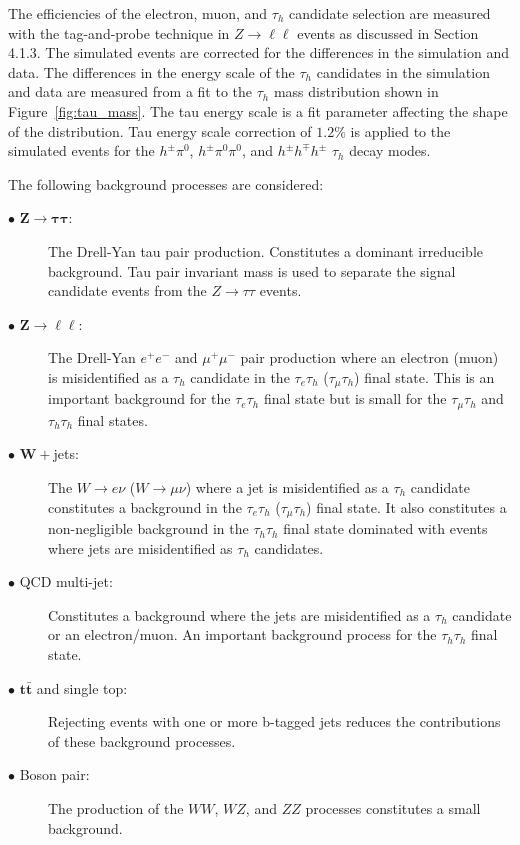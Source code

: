 The efficiencies of the electron, muon, and $\tau_h$ candidate selection are measured with the tag-and-probe technique in $Z\rightarrow \ell\ell$ events as discussed in Section 4.1.3. The simulated events are corrected for the differences in the simulation and data. The differences in the energy scale of the $\tau_h$ candidates in the simulation and data are measured from a fit to the $\tau_h$ mass distribution shown in Figure~\ref{fig:tau_mass}. The tau energy scale is a fit parameter affecting the shape of the distribution. Tau energy scale correction of $1.2\%$ is applied to the simulated events for the $h^{\pm}\pi^{0}$,  $h^{\pm}\pi^{0}\pi^{0}$, and $h^{\pm}h^{\mp}h^{\pm}$ $\tau_{h}$ decay modes. 

The following background processes are considered:
\begin{description}
\item[$\bullet$ $\boldsymbol{Z\rightarrow\tau\tau}$:] The Drell-Yan tau pair production. Constitutes a dominant irreducible background. Tau pair invariant mass is used to separate the signal candidate events from the  $Z\rightarrow\tau\tau$ events.
\item[$\bullet$ $\boldsymbol{Z\rightarrow\ell\ell}$:] The Drell-Yan $e^+e^-$ and $\mu^+\mu^-$ pair production where an electron (muon) is misidentified as a $\tau_h$ candidate in the $\tau_{e}\tau_h$ ($\tau_{\mu}\tau_h$) final state. This is an important background for the $\tau_{e}\tau_h$ final state but is small for the $\tau_{\mu}\tau_h$ and $\tau_{h}\tau_h$ final states.  
\item[$\bullet$ $\boldsymbol{W+}$jets:] The $W\rightarrow e\nu$ ($W\rightarrow \mu\nu$) where a jet is misidentified as a $\tau_h$ candidate constitutes a background in the $\tau_{e}\tau_h$ ($\tau_{\mu}\tau_h$) final state. It also constitutes a non-negligible background in the $\tau_{h}\tau_h$ final state dominated with events where jets are misidentified as  $\tau_h$ candidates. 
\item[$\bullet$ QCD multi-jet:] Constitutes a background where the jets are misidentified as a $\tau_h$ candidate or an electron/muon. An important background process for the $\tau_h\tau_h$ final state. 
\item[$\bullet$ $\boldsymbol{t\bar{t}}$ and single top:] Rejecting events with one or more  b-tagged jets reduces the contributions of these background processes.
\item[$\bullet$ Boson pair:] The production of the $WW$, $WZ$, and $ZZ$ processes constitutes a small background.
\end{description}    


